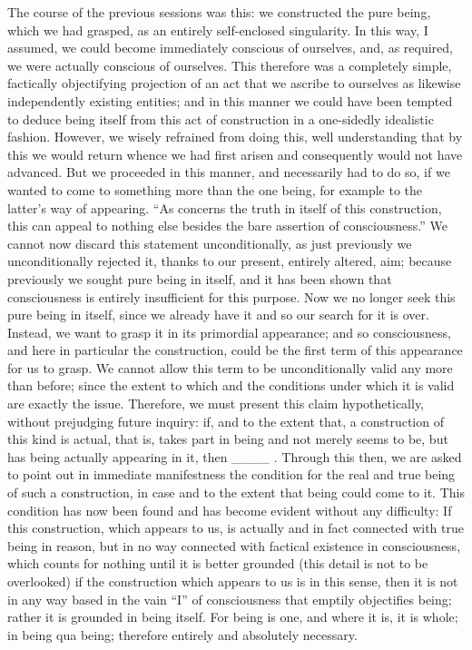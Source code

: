The course of the previous sessions was this:
we constructed the pure being, which we had grasped,
as an entirely self-enclosed singularity.
In this way, I assumed, we could become
immediately conscious of ourselves,
and, as required, we were actually conscious of ourselves.
This therefore was a completely simple, factically objectifying
projection of an act that we ascribe to ourselves
as likewise independently existing entities;
and in this manner we could have been tempted
to deduce being itself from this act of
construction in a one-sidedly idealistic fashion.
However, we wisely refrained from doing this,
well understanding that by this we would return
whence we had first arisen
and consequently would not have advanced.
But we proceeded in this manner,
and necessarily had to do so,
if we wanted to come to something
more than the one being,
for example to the latter's way of appearing.
“As concerns the truth in itself of this construction,
this can appeal to nothing else besides
the bare assertion of consciousness.”
We cannot now discard this statement unconditionally,
as just previously we unconditionally rejected it,
thanks to our present, entirely altered, aim;
because previously we sought pure being in itself,
and it has been shown that consciousness is
entirely insufficient for this purpose.
Now we no longer seek this pure being in itself,
since we already have it
and so our search for it is over.
Instead, we want to grasp it in its primordial appearance;
and so consciousness, and here in particular the construction,
could be the first term of this appearance for us to grasp.
We cannot allow this term to be unconditionally valid
any more than before;
since the extent to which and the conditions under which
it is valid are exactly the issue.
Therefore, we must present this claim hypothetically,
without prejudging future inquiry:
if, and to the extent that, a construction of this kind is actual,
that is, takes part in being and not merely seems to be,
but has being actually appearing in it, then ____ .
Through this then, we are asked to point out
in immediate manifestness the condition for
the real and true being of such a construction,
in case and to the extent that being could come to it.
This condition has now been found and has become
evident without any difficulty:
If this construction, which appears to us,
is actually and in fact connected with true being in reason,
but in no way connected with factical existence in consciousness,
which counts for nothing until it is better grounded
(this detail is not to be overlooked)
if the construction which appears to us is in this sense,
then it is not in any way based in the vain “I”
of consciousness that emptily objectifies being;
rather it is grounded in being itself.
For being is one, and where it is, it is whole; in being qua being;
therefore entirely and absolutely necessary.

